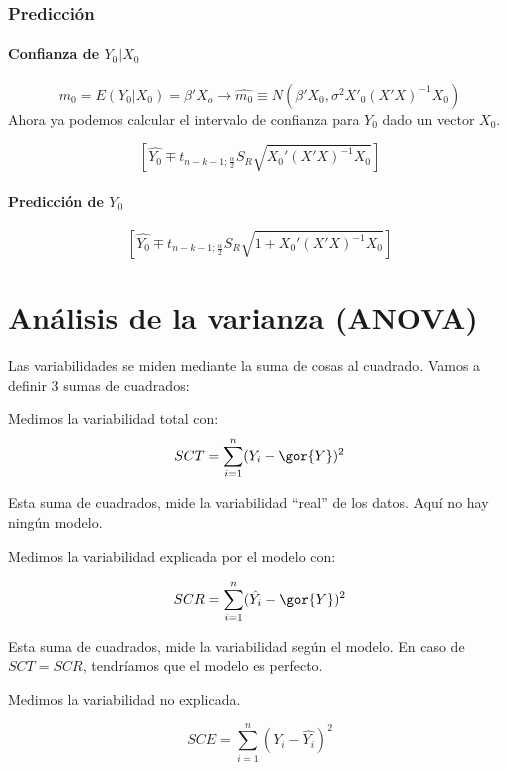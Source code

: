 \subsubsection{Predicción}

\paragraph{Confianza de $Y_0 | X_0$}
\[
m_0 = E(Y_0 | X_0) = β'X_o \to \hat{m_0} \equiv N\left( β'X_0 , σ^2X'_0(X'X)^{-1}X_0 \right)
\]
Ahora ya podemos calcular el intervalo de confianza para $Y_0$ dado un vector $X_0$.

\[
\left[ \hat{Y_0} \mp t_{n-k-1;\frac{α}{2}} S_R\sqrt{X_0'(X'X)^{-1}X_0} \right]
\]


\paragraph{Predicción de $Y_0$}

\[
\left[ \hat{Y_0} \mp t_{n-k-1;\frac{α}{2}} S_R\sqrt{1+X_0'(X'X)^{-1}X_0} \right]
\]

\section{Análisis de la varianza (ANOVA)}

Las variabilidades se miden mediante la suma de cosas al cuadrado. Vamos a definir 3 sumas de cuadrados:

\begin{defn}
Medimos la variabilidad total con:
\[SCT = \sum_{i=1}^n (Y_i - \gor{Y})^2\]

Esta suma de cuadrados, mide la variabilidad ``real'' de los datos. Aquí no hay ningún modelo.
\end{defn}

\begin{defn}
Medimos la variabilidad explicada por el modelo con:

\[SCR = \sum_{i=1}^n (\hat{Y_i} - \gor{Y})^2\]

Esta suma de cuadrados, mide la variabilidad según el modelo. En caso de $SCT = SCR$, tendríamos que el modelo es perfecto.
\end{defn}



\begin{defn}
Medimos la variabilidad no explicada.

\[SCE = \sum_{i=1}^n (Y_i - \hat{Y_i})^2\]

\end{defn}


